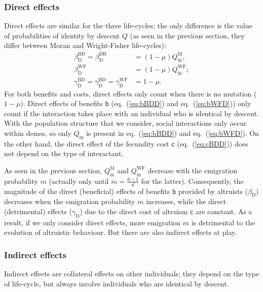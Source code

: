\documentclass[11pt, letterpaper]{article}
\renewcommand{\eqref}[1]{\textup{{\normalfont eq.~(\ref{#1}}\normalfont)}}
\newcommand{\bb}{\mathsf{b}}
\newcommand{\cc}{\mathsf{c}}
\newcommand{\direct}{\mathrm{D}}
\newcommand{\Moran}{\textrm{M}}
\newcommand{\BD}{\textrm{BD}}
\newcommand{\DB}{\textrm{DB}}
\newcommand{\WF}{\textrm{WF}}
\newcommand{\Qin}{Q_{\textrm{in}}}
\begin{document}
\subsubsection{Direct effects}
Direct effects are similar for the three life-cycles; the only difference is the value of probabilities of identity by descent $Q$ (as seen in the previous section, they differ between Moran and Wright-Fisher life-cycles):
%
\begin{subequations}\label{eq:directeffects}
\begin{align}
\beta_{\direct}^{\BD} = \beta_{\direct}^{\DB} &= \left( 1-\mu\right) \Qin^{\Moran}, \label{eq:bBDD}\\
\beta_{\direct}^{\WF} &= \left( 1-\mu\right) \Qin^{\WF}; \label{eq:bWFD}\\
%
%
\gamma_{\direct}^{\BD} = \gamma_{\direct}^{\BD} = \gamma_{\direct}^{\WF} &= 1-\mu.\label{eq:cBDD}
\end{align}
\end{subequations}
%
For both benefits and costs, direct effects only count when there is no mutation ($1-\mu$). 
Direct effects of benefits $\bb$ (\eqref{eq:bBDD} and \eqref{eq:bWFD}) only count if the interaction takes place with an individual who is identical by descent. With the population structure that we consider, social interactions only occur within demes, so only $\Qin$ is present in \eqref{eq:bBDD} and \eqref{eq:bWFD}. On the other hand, the direct effect of the fecundity cost $\cc$ (\eqref{eq:cBDD}) does not depend on the type of interactant. 

As seen in the previous section, $\Qin^{\Moran}$ and $\Qin^{\WF}$ decrease with the emigration probability $m$ (actually only until $m=\frac{d-1}{d}$ for the latter). Consequently, the magnitude of the direct (beneficial) effects of benefits $\bb$ provided by altruists ($\beta_{\direct}$) decreases when the emigration probability $m$ increases, while the direct (detrimental) effects ($\gamma_{\direct}$) due to the direct cost of altruism $\cc$ are constant. As a result, if we only consider direct effects, more emigration $m$ is detrimental to the evolution of altruistic behaviour. But there are also indirect effects at play. 

\subsubsection{Indirect effects}
Indirect effects are collateral effects on other individuals; they depend on the type of life-cycle, but always involve individuals who are identical by descent. 
\end{document}
